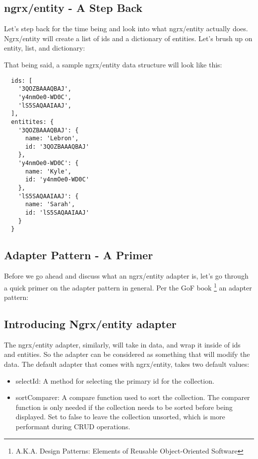 \subsection{ ngrx/entity - A Step Back }
Let's step back for the time being and look into what ngrx/entity actually does.
Ngrx/entity will create a list of ids and a dictionary of entities. Let's brush
up on entity, list, and dictionary:

That being said, a sample ngrx/entity data structure will look like this:
\begin{lstlisting}
  ids: [
    '3QOZBAAAQBAJ',
    'y4nmOe0-WD0C',
    'lS5SAQAAIAAJ',
  ],
  entitites: {
    '3QOZBAAAQBAJ': {
      name: 'Lebron',
      id: '3QOZBAAAQBAJ'
    },
    'y4nmOe0-WD0C': {
      name: 'Kyle',
      id: 'y4nmOe0-WD0C'
    },
    'lS5SAQAAIAAJ': {
      name: 'Sarah',
      id: 'lS5SAQAAIAAJ'
    }
  }

\end{lstlisting}

\subsection{ Adapter Pattern - A Primer  }
Before we go ahead and discuss what an ngrx/entity adapter is, let's go through
a quick primer on the adapter pattern in general. Per the GoF book
\footnote{A.K.A. Design Patterns: Elements of Reusable Object-Oriented Software}
an adapter pattern:


\subsection{ Introducing Ngrx/entity adapter }
The ngrx/entity adapter, similarly, will take in data, and wrap it inside of ids
and entities. So the adapter can be considered as something that will modify
the data. The default adapter that comes with ngrx/entity, takes two default
values:
\begin{itemize}
  \item selectId: A method for selecting the primary id for the collection.
  \item sortComparer: A compare function used to sort the collection. The
  comparer function is only needed if the collection needs to be sorted before
  being displayed. Set to false to leave the collection unsorted, which is more
  performant during CRUD operations.
\end{itemize}

